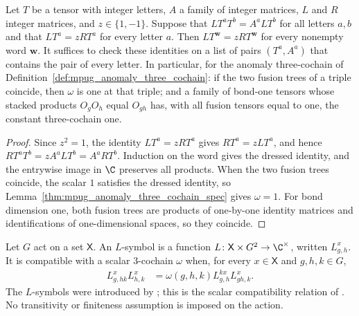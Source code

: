 \begin{lemma}%
    \label{thm:mpug_omega_integer_certificate}
    \leanok
    Let $T$ be a tensor with integer letters, $A$ a family of integer
    matrices, $L$ and $R$ integer matrices, and $z\in\{1,-1\}$. Suppose
    that $LT^aT^b=A^aLT^b$ for all letters $a,b$ and that $LT^a=zRT^a$ for
    every letter $a$. Then $LT^{\mathbf w}=zRT^{\mathbf w}$ for every nonempty
    word $\mathbf w$. It suffices to check these identities on a list of pairs
    $(T^a,A^a)$ that contains the pair of every letter. In particular, for the
    anomaly three-cochain of Definition~\ref{def:mpug_anomaly_three_cochain}:
    if the two fusion trees of a triple coincide, then $\omega$ is one at
    that triple; and a family of bond-one tensors whose stacked products
    $O_gO_h$ equal $O_{gh}$ has, with all fusion tensors equal to one, the
    constant three-cochain one.
\end{lemma}

\begin{proof}\leanok
    Since $z^2=1$, the identity $LT^a=zRT^a$ gives $RT^a=zLT^a$, and hence
    $RT^aT^b=zA^aLT^b=A^aRT^b$. Induction on the word gives the dressed
    identity, and the entrywise image in $\C$ preserves all products. When
    the two fusion trees coincide, the scalar $1$ satisfies the dressed
    identity, so Lemma~\ref{thm:mpug_anomaly_three_cochain_spec} gives
    $\omega=1$. For bond dimension one, both fusion trees are products of
    one-by-one identity matrices and identifications of one-dimensional
    spaces, so they coincide.
\end{proof}

\begin{definition}
    \label{def:mpug_l_symbols}
    \leanok
    Let $G$ act on a set $\mathsf X$. An $L$-symbol is a function
    $L\colon \mathsf X\times G^2\to\C^\times$, written $L^x_{g,h}$.
    It is compatible with a scalar $3$-cochain $\omega$ when, for every
    $x\in\mathsf X$ and $g,h,k\in G$,
    \begin{align}
        L^x_{g,hk}L^x_{h,k}
         & =\omega(g,h,k)L^{k x}_{g,h}L^x_{gh,k}.
        \label{eq:mpug_l_compatibility}
    \end{align}
    The $L$-symbols were introduced by
    \cite{GarreRubio2023MPOSym}; this is the scalar compatibility relation of
    \cite{FrancoRubio2025MPUGauging}. No transitivity or finiteness assumption
    is imposed on the action.
\end{definition}


